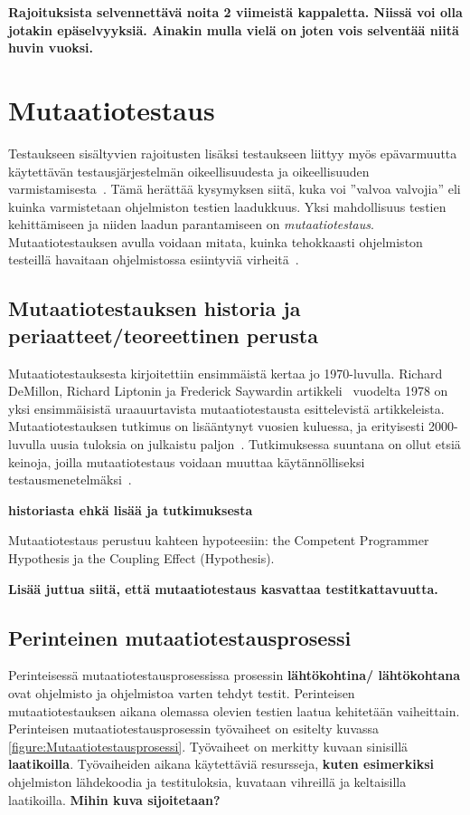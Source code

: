 \documentclass[finnish, grading]{tktltiki2}
\theoremstyle{definition}
\theoremstyle{remark}
\begin{document}
\textbf{Rajoituksista selvennettävä noita 2 viimeistä kappaletta. Niissä voi olla jotakin epäselvyyksiä. Ainakin mulla vielä on joten vois selventää niitä huvin vuoksi.}

\section{Mutaatiotestaus}

Testaukseen sisältyvien rajoitusten lisäksi testaukseen liittyy myös epävarmuutta käytettävän testausjärjestelmän oikeellisuudesta ja oikeellisuuden varmistamisesta~\cite[s. 209]{Manna:Waldinger:1978}. Tämä herättää kysymyksen siitä, kuka voi ''valvoa valvojia'' eli kuinka varmistetaan ohjelmiston testien laadukkuus. Yksi mahdollisuus testien kehittämiseen ja niiden laadun parantamiseen on \textit{mutaatiotestaus}. Mutaatiotestauksen avulla voidaan mitata, kuinka tehokkaasti ohjelmiston testeillä havaitaan ohjelmistossa esiintyviä virheitä~\cite[s. 649]{Jia:Harman:2011}.

\subsection{Mutaatiotestauksen historia ja periaatteet/teoreettinen perusta}

Mutaatiotestauksesta kirjoitettiin ensimmäistä kertaa jo 1970-luvulla. Richard DeMillon, Richard Liptonin ja Frederick Saywardin artikkeli~\cite{DeMillo:Lipton:Sayward:1978} vuodelta 1978 on yksi ensimmäisistä uraauurtavista mutaatiotestausta esittelevistä artikkeleista. Mutaatiotestauksen tutkimus on lisääntynyt vuosien kuluessa, ja erityisesti 2000-luvulla uusia tuloksia on julkaistu paljon~\cite[s. 1102]{Offutt:2011}. Tutkimuksessa suuntana on ollut etsiä keinoja, joilla mutaatiotestaus voidaan muuttaa käytännölliseksi testausmenetelmäksi~\cite[s. 649]{Jia:Harman:2011}. 

\textbf{historiasta ehkä lisää ja tutkimuksesta}

Mutaatiotestaus perustuu kahteen hypoteesiin: the Competent Programmer Hypothesis ja the Coupling Effect (Hypothesis).

\textbf{Lisää juttua siitä, että mutaatiotestaus kasvattaa testitkattavuutta.}

\subsection{Perinteinen mutaatiotestausprosessi}

Perinteisessä mutaatiotestausprosessissa prosessin \textbf{lähtökohtina/ lähtökohtana} ovat ohjelmisto ja ohjelmistoa varten tehdyt testit. Perinteisen mutaatiotestauksen aikana olemassa olevien testien laatua kehitetään vaiheittain. Perinteisen mutaatiotestausprosessin työvaiheet on esitelty kuvassa \ref{figure:Mutaatiotestausprosessi}. Työvaiheet on merkitty kuvaan sinisillä \textbf{laatikoilla}. Työvaiheiden aikana käytettäviä resursseja, \textbf{kuten esimerkiksi} ohjelmiston lähdekoodia ja testituloksia, kuvataan vihreillä ja keltaisilla laatikoilla. \textbf{Mihin kuva sijoitetaan?}
\end{document}
